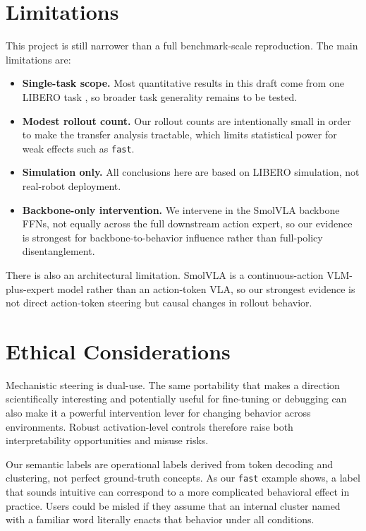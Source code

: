 \documentclass[11pt]{article}
\begin{document}
\section*{Limitations}

This project is still narrower than a full benchmark-scale reproduction. The main limitations are:
\begin{itemize}
    \item \textbf{Single-task scope.} Most quantitative results in this draft come from one LIBERO task \citep{liu2023libero}, so broader task generality remains to be tested.
    \item \textbf{Modest rollout count.} Our rollout counts are intentionally small in order to make the transfer analysis tractable, which limits statistical power for weak effects such as \texttt{fast}.
    \item \textbf{Simulation only.} All conclusions here are based on LIBERO simulation, not real-robot deployment.
    \item \textbf{Backbone-only intervention.} We intervene in the SmolVLA backbone FFNs, not equally across the full downstream action expert, so our evidence is strongest for backbone-to-behavior influence rather than full-policy disentanglement.
\end{itemize}

There is also an architectural limitation. SmolVLA is a continuous-action VLM-plus-expert model rather than an action-token VLA, so our strongest evidence is not direct action-token steering but causal changes in rollout behavior.

\section{Ethical Considerations}

Mechanistic steering is dual-use. The same portability that makes a direction scientifically interesting and potentially useful for fine-tuning or debugging can also make it a powerful intervention lever for changing behavior across environments. Robust activation-level controls therefore raise both interpretability opportunities and misuse risks.

Our semantic labels are operational labels derived from token decoding and clustering, not perfect ground-truth concepts. As our \texttt{fast} example shows, a label that sounds intuitive can correspond to a more complicated behavioral effect in practice. Users could be misled if they assume that an internal cluster named with a familiar word literally enacts that behavior under all conditions.
\end{document}

